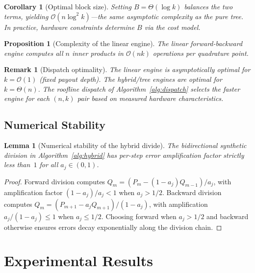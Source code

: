 \documentclass[11pt]{article}
\newtheorem{lemma}[theorem]{Lemma}
\newtheorem{corollary}[theorem]{Corollary}
\newtheorem{proposition}[theorem]{Proposition}
\newtheorem{remark}[theorem]{Remark}
\newcommand{\bigO}{\mathcal{O}}
\begin{document}
\begin{corollary}[Optimal block size]\label{cor:opt-block}
Setting $B = \Theta(\log k)$ balances the two terms, yielding
$\bigO(n \log^2 k)$---the same asymptotic complexity as the pure tree.
In practice, hardware constraints determine $B$ via the cost model.
\end{corollary}

\begin{proposition}[Complexity of the linear engine]\label{prop:linear-complexity}
The linear forward-backward engine computes all $n$ inner products in
$\bigO(nk)$ operations per quadrature point.
\end{proposition}

\begin{remark}[Dispatch optimality]
The linear engine is asymptotically optimal for $k = \bigO(1)$ (fixed
payout depth). The hybrid/tree engines are optimal for $k = \Theta(n)$.
The roofline dispatch of Algorithm~\ref{alg:dispatch} selects the faster
engine for each $(n, k)$ pair based on measured hardware characteristics.
\end{remark}

\subsection{Numerical Stability}

\begin{lemma}[Numerical stability of the hybrid divide]\label{lem:divide}
The bidirectional synthetic division in Algorithm~\ref{alg:hybrid} has
per-step error amplification factor strictly less than~$1$ for all
$a_j \in (0, 1)$.
\end{lemma}
\begin{proof}
Forward division computes $Q_m = (P_m - (1{-}a_j) Q_{m-1}) / a_j$,
with amplification factor $(1{-}a_j)/a_j < 1$ when $a_j > 1/2$.
Backward division computes $Q_m = (P_{m+1} - a_j Q_{m+1}) / (1{-}a_j)$,
with amplification $a_j/(1{-}a_j) \leq 1$ when $a_j \le 1/2$.
Choosing forward when $a_j > 1/2$ and backward otherwise ensures errors
decay exponentially along the division chain.
\end{proof}

\section{Experimental Results}\label{sec:experiments}
\end{document}
